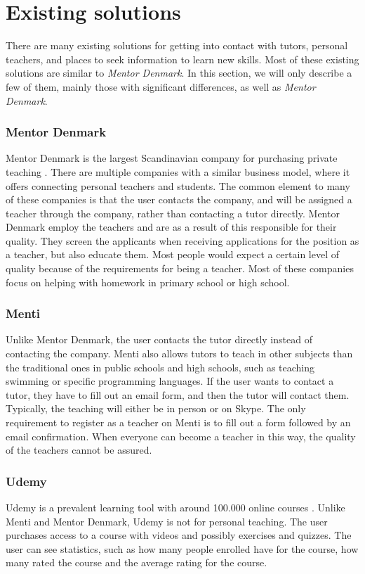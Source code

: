 \section{Existing solutions}
There are many existing solutions for getting into contact with tutors, personal teachers, and places to seek information to learn new skills.
Most of these existing solutions are similar to \textit{Mentor Denmark}.  
In this section, we will only describe a few of them, mainly those with significant differences, as well as \textit{Mentor Denmark}.

\subsubsection{Mentor Denmark}
Mentor Denmark is the largest Scandinavian company for purchasing private teaching \cite{skandinaviens-stoeste-lektiefirma}.
There are multiple companies with a similar business model, where it offers connecting personal teachers and students. 
The common element to many of these companies is that the user contacts the company, and will be assigned a teacher through the company, rather than contacting a tutor directly.
Mentor Denmark employ the teachers and are as a result of this responsible for their quality. 
They screen the applicants when receiving applications for the position as a teacher, but also educate them. 
Most people would expect a certain level of quality because of the requirements for being a teacher.
Most of these companies focus on helping with homework in primary school or high school.

\subsubsection{Menti}
Unlike Mentor Denmark, the user contacts the tutor directly instead of contacting the company.
Menti also allows tutors to teach in other subjects than the traditional ones in public schools and high schools, such as teaching swimming or specific programming languages.
If the user wants to contact a tutor, they have to fill out an email form, and then the tutor will contact them.
Typically, the teaching will either be in person or on Skype.
The only requirement to register as a teacher on Menti is to fill out a form followed by an email confirmation.
When everyone can become a teacher in this way, the quality of the teachers cannot be assured.

\subsubsection{Udemy}
Udemy is a prevalent learning tool with around 100.000 online courses \cite{udemy}.
Unlike Menti and Mentor Denmark, Udemy is not for personal teaching. 
The user purchases access to a course with videos and possibly exercises and quizzes. 
The user can see statistics, such as how many people enrolled have for the course, how many rated the course and the average rating for the course.

